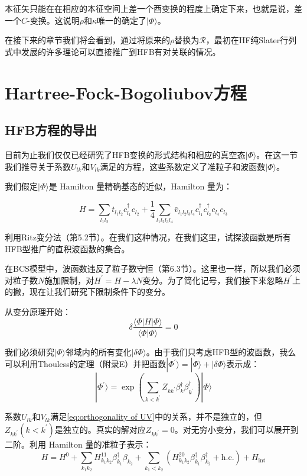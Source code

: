 本征矢只能在在相应的本征空间上差一个酉变换的程度上确定下来，也就是说，差一个$C$-变换。这说明$\rho$和$\kappa$唯一的确定了$|\Phi\rangle$。

在接下来的章节我们将会看到，通过将原来的$\rho$替换为$\mathcal{R}$，最初在HF纯Slater行列式中发展的许多理论可以直接推广到HFB有对关联的情况。

\section{Hartree-Fock-Bogoliubov方程}

\subsection{HFB方程的导出}

目前为止我们仅仅已经研究了HFB变换的形式结构和相应的真空态$|\Phi\rangle$。在这一节我们推导关于系数$U_{lk}$和$V_{lk}$满足的方程，这些系数定义了准粒子和波函数$|\Phi\rangle$。

我们假定$|\Phi\rangle$是 Hamilton 量精确基态的近似，Hamilton 量为：

\[
H=\sum_{l_{1}l_{2}}t_{l_{1}l_{2}}c^{\dagger}_{l_{1}}c_{l_{2}}+\frac{1}{4}\sum_{l_{1}l_{2}l_{3}l_{4}}\bar{v}_{l_{1}l_{2}l_{3}l_{4}}c^{\dagger}_{l_{1}}c^{\dagger}_{l_{2}}c_{l_{4}}c_{l_{3}}
\]

利用Ritz变分法（第5.2节）。在我们这种情况，在我们这里，试探波函数是所有HFB型推广的直积波函数的集合。

在BCS模型中，波函数违反了粒子数守恒（第6.3节）。这里也一样，所以我们必须对粒子数$N$施加限制，对$H^{\prime}=H-\lambda N$变分。为了简化记号，我们接下来忽略$H^{\prime}$上的撇，现在让我们研究下限制条件下的变分。

从变分原理开始：
\[
\delta\frac{\langle\Phi|H|\Phi\rangle}{\langle\Phi|\Phi\rangle}=0
\]

我们必须研究$|\Phi\rangle$邻域内的所有变化$|\delta\Phi\rangle$。由于我们只考虑HFB型的波函数，我么可以利用Thouless的定理（附录E）并把函数$|\Phi^{\prime}\rangle=|\Phi\rangle+|\delta\Phi\rangle$表示成：
\[
|\Phi^{\prime}\rangle=\exp\left(\sum_{k<k^{\prime}}Z_{kk^{\prime}}\beta^{\dagger}_{k}\beta^{\dagger}_{k^{\prime}}\right)|\Phi\rangle
\]

系数$U_{lk}$和$V_{lk}$满足\ref{eq:orthogonality of UV}中的关系，并不是独立的，但$Z_{kk^{\prime}}(k<k^{\prime})$是独立的。真实的解对应$Z_{kk^{\prime}}=0$。对无穷小变分，我们可以展开到二阶。利用
Hamilton 量的准粒子表示：
\[
H=H^{0}+\sum_{k_{1}k_{2}}H^{11}_{k_{1}k_{2}}\beta^{\dagger}_{k_{1}}\beta_{k_{2}}+\sum_{k_{1}<k_{2}}(H^{20}_{k_{1}k_{2}}\beta^{\dagger}_{k_{1}}\beta^{\dagger}_{k_{2}}+\text{h.c.})+H_{\text{int}}
\]

